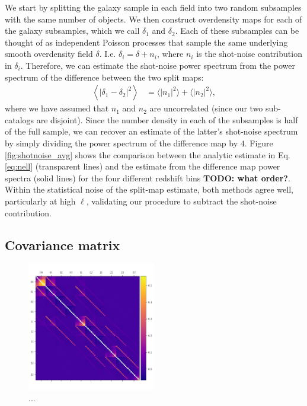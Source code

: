 \documentclass[a4paper,11pt]{article}
\newcommand{\todo}[1]{{\bf TODO: #1}}
\begin{document}
      We start by splitting the galaxy sample in each field into two random subsamples with the same number of objects.  We then construct overdensity maps for each of the galaxy subsamples, which we call $\delta_1$ and $\delta_2$.  Each of these subsamples can be thought of as independent Poisson processes that sample the same underlying smooth overdensity field $\delta$. I.e. $\delta_i = \delta + n_i$, where $n_i$ is the shot-noise contribution in $\delta_i$. Therefore, we can estimate the shot-noise power spectrum from the power spectrum of the difference between the two split maps:
      \begin{align}
      \left\langle |\delta_1 - \delta_2|^2 \right\rangle & = \langle|n_1|^2\rangle + \langle|n_2|^2\rangle,
      \end{align}
      where we have assumed that $n_1$ and $n_2$ are uncorrelated (since our two sub-catalogs are disjoint). Since the number density in each of the subsamples is half of the full sample, we can recover an estimate of the latter's shot-noise spectrum by simply dividing the power spectrum of the difference map by $4$. Figure \ref{fig:shotnoise_avg} shows the comparison between the analytic estimate in Eq. \ref{eq:nell} (transparent lines) and the estimate from the difference map power spectra (solid lines) for the four different redshift bins \todo{what order?}. Within the statistical noise of the split-map estimate, both methods agree well, particularly at high $\ell$, validating our procedure to subtract the shot-noise contribution.
      
    
\subsection{Covariance matrix}

\begin{figure}
\begin{center}
\includegraphics[width=0.5\textwidth]{figures/covmat_HSC_dg_hoddg_hodxdg_hoddg_hod_trisp=4h3h2h_SSC=PT-resp_mode=LINBIAS_l=ells_eff_all_wcross_clfit=HOD-zevol_culled=True_coadd=area_G+NG+SSC.pdf}
\caption{...}
\label{fig:covmat}
\end{center}
\end{figure}
\end{document}
